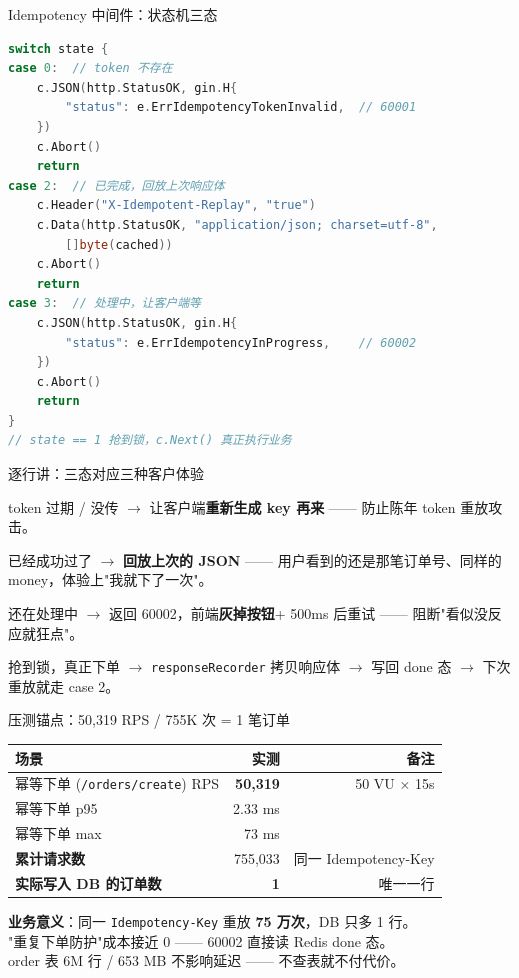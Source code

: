 \documentclass[aspectratio=169,11pt]{beamer}
\begin{document}
\begin{frame}{Idempotency 中间件：状态机三态}
\begin{lstlisting}[language=Go,firstnumber=72,
  caption={}]
switch state {
case 0:  // token 不存在
    c.JSON(http.StatusOK, gin.H{
        "status": e.ErrIdempotencyTokenInvalid,  // 60001
    })
    c.Abort()
    return
case 2:  // 已完成，回放上次响应体
    c.Header("X-Idempotent-Replay", "true")
    c.Data(http.StatusOK, "application/json; charset=utf-8",
        []byte(cached))
    c.Abort()
    return
case 3:  // 处理中，让客户端等
    c.JSON(http.StatusOK, gin.H{
        "status": e.ErrIdempotencyInProgress,    // 60002
    })
    c.Abort()
    return
}
// state == 1 抢到锁，c.Next() 真正执行业务
\end{lstlisting}
\end{frame}

\begin{frame}[shrink]{逐行讲：三态对应三种客户体验}
\begin{description}\setlength{\itemsep}{0.5mm}
  \item[\texttt{state=0}] token 过期 / 没传 $\to$ 让客户端\textbf{重新生成 key 再来} —— 防止陈年 token 重放攻击。
  \item[\texttt{state=2}] 已经成功过了 $\to$ \textbf{回放上次的 JSON} —— 用户看到的还是那笔订单号、同样的 money，体验上"我就下了一次"。
  \item[\texttt{state=3}] 还在处理中 $\to$ 返回 60002，前端\textbf{灰掉按钮}+ 500ms 后重试 —— 阻断"看似没反应就狂点"。
  \item[\texttt{state=1}] 抢到锁，真正下单 $\to$ \texttt{responseRecorder} 拷贝响应体 $\to$ 写回 done 态 $\to$ 下次重放就走 case 2。
\end{description}
\end{frame}

\begin{frame}[shrink]{压测锚点：50,319 RPS / 755K 次 = 1 笔订单}
\begin{tabular}{@{}lrr@{}}
\toprule
场景 & 实测 & 备注 \\
\midrule
幂等下单 (\texttt{/orders/create}) RPS  & \textbf{50{,}319} & 50 VU × 15s \\
幂等下单 p95                            & 2.33 ms        & \\
幂等下单 max                            & 73 ms          & \\
\textbf{累计请求数}                     & 755{,}033      & 同一 Idempotency-Key \\
\textbf{实际写入 DB 的订单数}           & \textbf{1}     & 唯一一行 \\
\bottomrule
\end{tabular}
\vspace{3mm}
\small \textbf{业务意义}：同一 \texttt{Idempotency-Key} 重放 \textbf{75 万次}，DB 只多 1 行。\\
"重复下单防护"成本接近 0 —— 60002 直接读 Redis done 态。\\
order 表 6M 行 / 653 MB 不影响延迟 —— 不查表就不付代价。
\end{frame}
\end{document}
